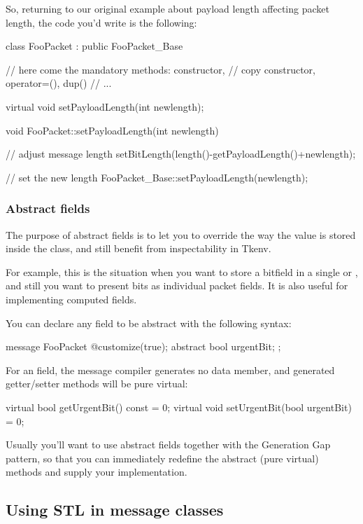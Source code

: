 So, returning to our original example about payload length
affecting packet length, the code you'd write is the following:

\begin{cpp}
class FooPacket : public FooPacket_Base
{
    // here come the mandatory methods: constructor,
    // copy constructor, operator=(), dup()
    // ...

    virtual void setPayloadLength(int newlength);
}

void FooPacket::setPayloadLength(int newlength)
{
    // adjust message length
    setBitLength(length()-getPayloadLength()+newlength);

    // set the new length
    FooPacket_Base::setPayloadLength(newlength);
}
\end{cpp}



\subsubsection{Abstract fields}

The purpose of abstract fields is to let you to override
the way the value is stored inside the class,
and still benefit from inspectability in Tkenv.

For example, this is the situation when you want to store a bitfield
in a single  or , and still you want
to present bits as individual packet fields.
It is also useful for implementing computed fields.

You can declare any field to be abstract with the following syntax:

\begin{msg}
message FooPacket
{
   @customize(true);
   abstract bool urgentBit;
};
\end{msg}

For an  field, the message compiler generates
no data member, and generated getter/setter methods will be pure
virtual:

\begin{cpp}
virtual bool getUrgentBit() const = 0;
virtual void setUrgentBit(bool urgentBit) = 0;
\end{cpp}


Usually you'll want to use abstract fields together with
the Generation Gap pattern, so that you can immediately
redefine the abstract (pure virtual) methods and
supply your implementation.



\subsection{Using STL in message classes}



